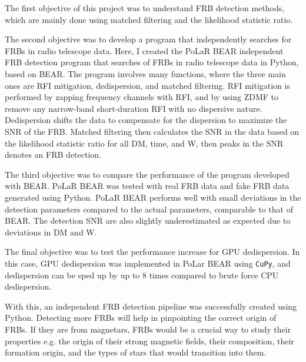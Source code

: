The first objective of this project was to understand FRB detection methods, which are mainly done using matched filtering and the likelihood statistic ratio. 

The second objective was to develop a program that independently searches for FRBs in radio telescope data. Here, I created the PoLaR BEAR independent FRB detection program that searches of FRBs in radio telescope data in Python, based on BEAR. The program involves many functions, where the three main ones are RFI mitigation, dedispersion, and matched filtering. RFI mitigation is performed by zapping frequency channels with RFI, and by using ZDMF to remove any narrow-band short-duration RFI with no dispersive nature. Dedispersion shifts the data to compensate for the dispersion to maximize the SNR of the FRB. Matched filtering then calculates the SNR in the data based on the likelihood statistic ratio for all DM, time, and W, then peaks in the SNR denotes an FRB detection. 

The third objective was to compare the performance of the program developed with BEAR. PoLaR BEAR was tested with real FRB data and fake FRB data generated using Python. PoLaR BEAR performs well with small deviations in the detection parameters compared to the actual parameters, comparable to that of BEAR. The detection SNR are also slightly underestimated as expected due to deviations in DM and W.

The final objective was to test the performance increase for GPU dedispersion. In this case, GPU dedispersion was implemented in PoLar BEAR using \texttt{CuPy}, and dedispersion can be sped up by up to 8 times compared to brute force CPU dedispersion.

With this, an independent FRB detection pipeline was successfully created using Python. Detecting more FRBs will help in pinpointing the correct origin of FRBs. If they are from magnetars, FRBs would be a crucial way to study their properties e.g. the origin of their strong magnetic fields, their composition, their formation origin, and the types of stars that would transition into them.